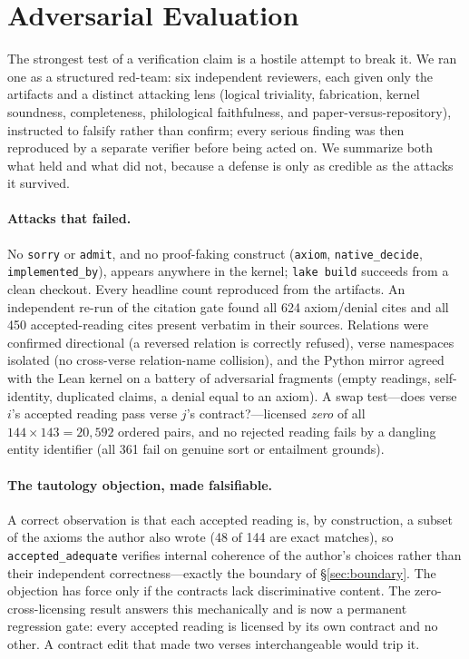 \documentclass[11pt]{article}
\begin{document}
\section{Adversarial Evaluation}
\label{sec:adversarial}

The strongest test of a verification claim is a hostile attempt to break it.
We ran one as a structured red-team: six independent reviewers, each given
only the artifacts and a distinct attacking lens (logical triviality,
fabrication, kernel soundness, completeness, philological faithfulness, and
paper-versus-repository), instructed to falsify rather than confirm; every
serious finding was then reproduced by a separate verifier before being
acted on. We summarize both what held and what did not, because a defense
is only as credible as the attacks it survived.

\paragraph{Attacks that failed.} No \texttt{sorry} or \texttt{admit}, and no
proof-faking construct (\texttt{axiom}, \texttt{native\_decide},
\texttt{implemented\_by}), appears anywhere in the kernel; \texttt{lake
build} succeeds from a clean checkout. Every headline count reproduced from
the artifacts. An independent re-run of the citation gate found all 624
axiom/denial cites and all 450 accepted-reading cites present verbatim in
their sources. Relations were confirmed directional (a reversed relation is
correctly refused), verse namespaces isolated (no cross-verse relation-name
collision), and the Python mirror agreed with the Lean kernel on a battery
of adversarial fragments (empty readings, self-identity, duplicated claims,
a denial equal to an axiom). A swap test---does verse $i$'s accepted reading
pass verse $j$'s contract?---licensed \emph{zero} of all $144 \times 143 =
20{,}592$ ordered pairs, and no rejected reading fails by a dangling entity
identifier (all 361 fail on genuine sort or entailment grounds).

\paragraph{The tautology objection, made falsifiable.} A correct observation
is that each accepted reading is, by construction, a subset of the axioms the
author also wrote (48 of 144 are exact matches), so \texttt{accepted\_adequate}
verifies internal coherence of the author's choices rather than their
independent correctness---exactly the boundary of \S\ref{sec:boundary}. The
objection has force only if the contracts lack discriminative content. The
zero-cross-licensing result answers this mechanically and is now a permanent
regression gate: every accepted reading is licensed by its own contract and
no other. A contract edit that made two verses interchangeable would trip it.
\end{document}
